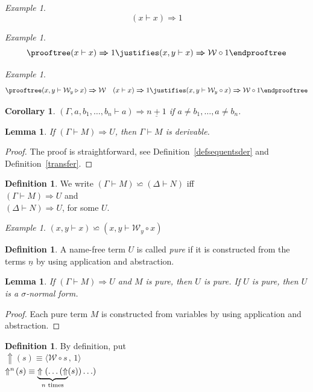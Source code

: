 \documentclass[11pt]{amsart}
\def\ruleone#1#2{\prooftree #1 \justifies #2 \endprooftree}
\def\ruletwo#1#2#3{\ruleone{#1\quad #2}{#3}}
\theoremstyle{plain}
\newtheorem{corollary}[theorem]{Corollary}
\newtheorem{lemma}[theorem]{Lemma}
\theoremstyle{definition}
\newtheorem{definition}[theorem]{Definition}
\theoremstyle{remark}
\newtheorem{example}[theorem]{Example}
\numberwithin{equation}{section}
\newcommand{\tri}{\triangleright}
\newcommand{\ci}{\circ}
\newcommand{\mi}{\,,\,}
\newcommand{\la}{\langle}
\newcommand{\ra}{\rangle}
\newcommand{\x}{a}
\newcommand{\y}{b}
\renewcommand{\pi}{\mathcal{W}}
\begin{document}
\begin{example}
$$
(x\vdash x)\boldsymbol{\Rightarrow} 1
$$
\end{example}
\begin{example}
$$
\ruleone{(x\vdash x)\boldsymbol{\Rightarrow} 1}{(x,y \vdash
x)\boldsymbol{\Rightarrow}  \pi\ci 1}
$$
\end{example}
\begin{example}
$$
\ruletwo{(x,y \vdash \pi_y\tri x) \boldsymbol{\Rightarrow} \pi}{(x
\vdash x) \boldsymbol{\Rightarrow} 1}{(x,y \vdash \pi_y\ci x)
\boldsymbol{\Rightarrow}
  \pi\ci 1}
$$
\end{example}
\begin{corollary}
 $(\Gamma,\x,\y_1,\ldots,\y_n\vdash
\x)\boldsymbol{\Rightarrow}\underline{n+1}$ if $\x\neq
\y_1,\ldots,\x\neq \y_n$.
\end{corollary}
\begin{lemma}\label{poleznaya}If $(\Gamma\vdash M)\boldsymbol{\Rightarrow} U$, then
$\Gamma\vdash M$ is derivable.
\end{lemma}
\begin{proof}The proof is straightforward, see Definition~\ref{defsequentsder}
and Definition~\ref{transfer}.
\end{proof}
\begin{definition}We  write
$(\Gamma\vdash M)\backsimeq(\Delta\vdash N)$
iff\\
$(\Gamma\vdash M)\boldsymbol{\Rightarrow} U$ and\\
$(\Delta\vdash N)\boldsymbol{\Rightarrow} U$, for some $U$.
\end{definition}
\begin{example}
$(x,y\vdash x)\backsimeq (x,y\vdash\pi_y\ci x)$
\end{example}
\begin{definition}A name-free term $U$ is called \emph{pure} if
it is constructed from the terms $\underline{n}$ by using
application and abstraction.
\end{definition}
\begin{lemma}\label{purelemma}If $(\Gamma\vdash M)\boldsymbol{\Rightarrow} U$ and $
M$ is pure, then $U$ is pure. If  $U$ is pure, then $U$ is a
$\sigma$-normal form.
\end{lemma}
\begin{proof}Each pure term $M$ is constructed from variables by using application and abstraction.
\end{proof}
\begin{definition}By definition, put\\
$\Uparrow(s)\equiv\la\pi\ci s\mi 1\ra$ \\
$\Uparrow^n\!(s)\equiv\underbrace{\Uparrow(\ldots(\Uparrow}_{\mbox{\scriptsize
$n$ times}}(s))\ldots) $
\end{definition}
\end{document}
